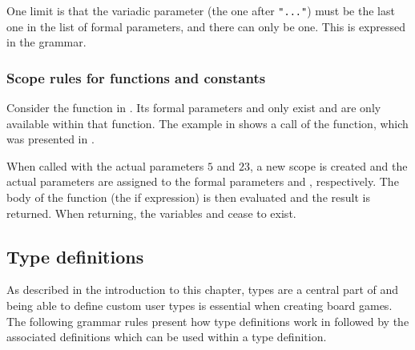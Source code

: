 
One limit is that the variadic parameter (the one after \texttt{"..."}) must be
the last one in the list of formal parameters, and there can only be one. This
is expressed in the grammar.

\subsubsection{Scope rules for functions and constants}

Consider the  function in . Its formal
parameters  and  only exist and are only available
within that function. The example in  shows a call of the
 function, which was presented in .


When called with the actual parameters $5$ and $23$, a new scope is created and
the actual parameters are assigned to the formal parameters  and
, respectively. The body of the function (the if expression) is then
evaluated and the result is returned. When returning, the variables
 and  cease to exist. 

\subsection{Type definitions}
\label{sec:typedefinitions}

As described in the introduction to this chapter, types are a central part of
\productname{} and being able to define custom user types is essential when
creating board games.
The following grammar rules present how type definitions work in
\productname{} followed by the associated definitions which can be used within
a type definition.

\begin{ebnf}
 
\end{ebnf}

